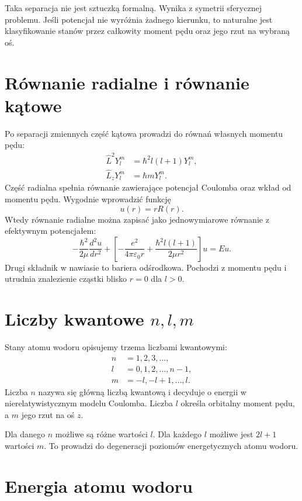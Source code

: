 Taka separacja nie jest sztuczką formalną. Wynika z symetrii sferycznej problemu. Jeśli potencjał nie wyróżnia żadnego kierunku, to naturalne jest klasyfikowanie stanów przez całkowity moment pędu oraz jego rzut na wybraną oś.

\section{Równanie radialne i równanie kątowe}

Po separacji zmiennych część kątowa prowadzi do równań własnych momentu pędu:
\begin{align}
    \hat{L}^2Y_l^m &= \hbar^2 l(l+1)Y_l^m,\\
    \hat{L}_zY_l^m &= \hbar mY_l^m.
\end{align}
Część radialna spełnia równanie zawierające potencjał Coulomba oraz wkład od momentu pędu. Wygodnie wprowadzić funkcję
\begin{equation}
    u(r)=rR(r).
\end{equation}
Wtedy równanie radialne można zapisać jako jednowymiarowe równanie z efektywnym potencjałem:
\begin{equation}
    -\frac{\hbar^2}{2\mu}\frac{d^2u}{dr^2}
    +\left[-\frac{e^2}{4\pi\varepsilon_0 r}
    +\frac{\hbar^2l(l+1)}{2\mu r^2}\right]u=Eu.
\end{equation}
Drugi składnik w nawiasie to bariera odśrodkowa. Pochodzi z momentu pędu i utrudnia znalezienie cząstki blisko \(r=0\) dla \(l>0\).

\section{Liczby kwantowe \texorpdfstring{\(n,l,m\)}{n,l,m}}

Stany atomu wodoru opisujemy trzema liczbami kwantowymi:
\begin{align}
    n&=1,2,3,\ldots,\\
    l&=0,1,2,\ldots,n-1,\\
    m&=-l,-l+1,\ldots,l.
\end{align}
Liczba \(n\) nazywa się główną liczbą kwantową i decyduje o energii w nierelatywistycznym modelu Coulomba. Liczba \(l\) określa orbitalny moment pędu, a \(m\) jego rzut na oś \(z\).

Dla danego \(n\) możliwe są różne wartości \(l\). Dla każdego \(l\) możliwe jest \(2l+1\) wartości \(m\). To prowadzi do degeneracji poziomów energetycznych atomu wodoru.

\section{Energia atomu wodoru}

